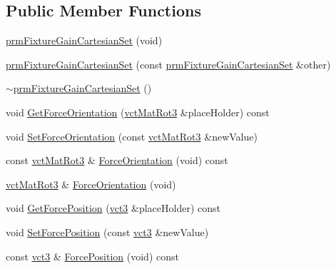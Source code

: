 \subsection*{Public Member Functions}
\begin{DoxyCompactItemize}
\item 
\hyperlink{classprm_fixture_gain_cartesian_set_aeabab7244ddacb31ebe44b6e3a22af09}{prm\+Fixture\+Gain\+Cartesian\+Set} (void)
\item 
\hyperlink{classprm_fixture_gain_cartesian_set_a4748bbff8176a507126ea217e11220a6}{prm\+Fixture\+Gain\+Cartesian\+Set} (const \hyperlink{classprm_fixture_gain_cartesian_set}{prm\+Fixture\+Gain\+Cartesian\+Set} \&other)
\item 
\hyperlink{classprm_fixture_gain_cartesian_set_a8ad0c5ddfae4d37f371c832932252b36}{$\sim$prm\+Fixture\+Gain\+Cartesian\+Set} ()
\item 
void \hyperlink{classprm_fixture_gain_cartesian_set_a08bdb2564863a931c0c8f00f9d44e6ca}{Get\+Force\+Orientation} (\hyperlink{vct_transformation_types_8h_a30fe23c1d38748a9b8f2fb9bb2471382}{vct\+Mat\+Rot3} \&place\+Holder) const 
\item 
void \hyperlink{classprm_fixture_gain_cartesian_set_ace97a49aa55a292d51fd4ac1ff9a40a1}{Set\+Force\+Orientation} (const \hyperlink{vct_transformation_types_8h_a30fe23c1d38748a9b8f2fb9bb2471382}{vct\+Mat\+Rot3} \&new\+Value)
\item 
const \hyperlink{vct_transformation_types_8h_a30fe23c1d38748a9b8f2fb9bb2471382}{vct\+Mat\+Rot3} \& \hyperlink{classprm_fixture_gain_cartesian_set_a6e30c631f54383385c25bbc261c3ae78}{Force\+Orientation} (void) const 
\item 
\hyperlink{vct_transformation_types_8h_a30fe23c1d38748a9b8f2fb9bb2471382}{vct\+Mat\+Rot3} \& \hyperlink{classprm_fixture_gain_cartesian_set_a359d932fa58baff0a1ba4bd052ff3ec1}{Force\+Orientation} (void)
\item 
void \hyperlink{classprm_fixture_gain_cartesian_set_a6794ab2c78f5fae4589689dc8bbd2718}{Get\+Force\+Position} (\hyperlink{vct_fixed_size_vector_types_8h_a3af82acdbf4eeb73c551909240b106ea}{vct3} \&place\+Holder) const 
\item 
void \hyperlink{classprm_fixture_gain_cartesian_set_a4bde1be2d9fff2516fb4d8eeb232911d}{Set\+Force\+Position} (const \hyperlink{vct_fixed_size_vector_types_8h_a3af82acdbf4eeb73c551909240b106ea}{vct3} \&new\+Value)
\item 
const \hyperlink{vct_fixed_size_vector_types_8h_a3af82acdbf4eeb73c551909240b106ea}{vct3} \& \hyperlink{classprm_fixture_gain_cartesian_set_a29e5d95b17dcc05c6cdc45e3491d1237}{Force\+Position} (void) const 

\end{DoxyCompactItemize}
